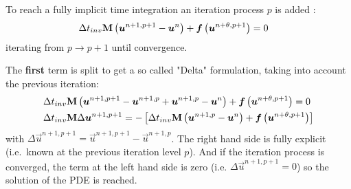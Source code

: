 To reach a fully implicit time integration an iteration process $p$ is added \citep[eqs.\ 15/16]{Borsboom2019a}:
\begin{align}
    &\Delta t_{inv} \mbox{\boldmath ${\rm M}$} \left( \mbox{\boldmath ${u}$}^{n+1,p+1} - \mbox{\boldmath ${u}$}^{n} \right)  +
    \mbox{\boldmath ${f}$} \left( \mbox{\boldmath ${u}$}^{n+\theta, p+1} \right) = 0
    \label{eq:1D_iteration}
\end{align}
iterating from $p \rightarrow p+1$ until convergence.

The \textbf{first} term is split to get a so called "Delta" formulation, taking into account the previous iteration:
\begin{align}
    &\Delta t_{inv} \mbox{\boldmath ${\rm M}$} \left( \mbox{\boldmath ${u}$}^{n+1,p+1} - \mbox{\boldmath ${u}$}^{n+1,p} + \mbox{\boldmath ${u}$}^{n+1,p} - \mbox{\boldmath ${u}$}^{n} \right) + \mbox{\boldmath ${f}$} \left( \mbox{\boldmath ${u}$}^{n+\theta, p+1} \right) = 0
    \\
    & \Delta t_{inv} \mbox{\boldmath ${\rm M}$} \Delta \mbox{\boldmath ${u}$}^{n+1,p+1}   =
    - \left[ \Delta t_{inv} \mbox{\boldmath ${\rm M}$} \left( \mbox{\boldmath ${u}$}^{n+1,p} - \mbox{\boldmath ${u}$}^{n} \right) + \mbox{\boldmath ${f}$} \left( \mbox{\boldmath ${u}$}^{n+\theta, p+1} \right) \right]
\end{align}
with $\Delta \vec{u}^{n+1,p+1} = \vec{u}^{n+1,p+1} - \vec{u}^{n+1,p}$.
The right hand side is fully explicit (i.e.\ known at the previous iteration level $p$).
And if the iteration process is converged, the term at the left hand side is zero (i.e. $\Delta \vec{u}^{n+1,p+1} = 0$) so the solution of the PDE is reached.

